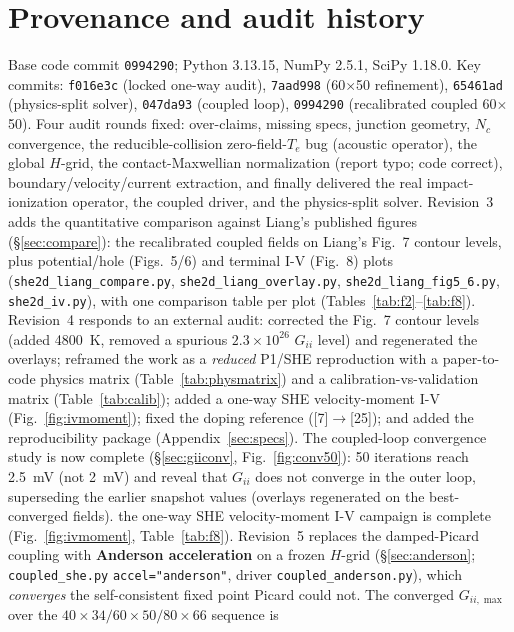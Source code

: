 \documentclass[11pt]{article}
\begin{document}
\section{Provenance and audit history}\label{sec:history}
Base code commit \texttt{0994290}; Python 3.13.15, NumPy 2.5.1, SciPy 1.18.0. Key commits:
\texttt{f016e3c} (locked one-way audit), \texttt{7aad998} (60$\times$50 refinement),
\texttt{65461ad} (physics-split solver), \texttt{047da93} (coupled loop), \texttt{0994290}
(recalibrated coupled 60$\times$50). Four audit rounds fixed:
over-claims, missing specs, junction geometry, $N_c$ convergence, the reducible-collision
zero-field-$T_e$ bug (acoustic operator), the global $H$-grid, the contact-Maxwellian
normalization (report typo; code correct), boundary/velocity/current extraction, and finally
delivered the real impact-ionization operator, the coupled driver, and the physics-split solver.
Revision~3 adds the quantitative comparison against Liang's published figures
(\S\ref{sec:compare}): the recalibrated coupled fields on Liang's Fig.~7 contour levels, plus
potential/hole (Figs.~5/6) and terminal I-V (Fig.~8) plots
(\texttt{she2d\_liang\_compare.py}, \texttt{she2d\_liang\_overlay.py},
\texttt{she2d\_liang\_fig5\_6.py}, \texttt{she2d\_iv.py}), with one comparison table per plot
(Tables~\ref{tab:f2}--\ref{tab:f8}).
Revision~4 responds to an external audit: corrected the Fig.~7 contour levels (added \SI{4800}{K},
removed a spurious $2.3\times10^{26}$ $G_{ii}$ level) and regenerated the overlays; reframed the
work as a \emph{reduced} P1/SHE reproduction with a paper-to-code physics matrix
(Table~\ref{tab:physmatrix}) and a calibration-vs-validation matrix (Table~\ref{tab:calib});
added a one-way SHE velocity-moment I-V (Fig.~\ref{fig:ivmoment}); fixed the doping reference
([7]$\to$[25]); and added the reproducibility package (Appendix~\ref{sec:specs}). The coupled-loop convergence study is
now complete (\S\ref{sec:giiconv}, Fig.~\ref{fig:conv50}): 50 iterations reach \SI{2.5}{mV} (not
\SI{2}{mV}) and reveal that $G_{ii}$ does not converge in the outer loop, superseding the earlier
snapshot values (overlays regenerated on the best-converged fields). the one-way SHE velocity-moment I-V
campaign is complete (Fig.~\ref{fig:ivmoment}, Table~\ref{tab:f8}).
Revision~5 replaces the damped-Picard coupling with \textbf{Anderson acceleration} on a frozen
$H$-grid (\S\ref{sec:anderson}; \texttt{coupled\_she.py} \texttt{accel="anderson"}, driver
\texttt{coupled\_anderson.py}), which \emph{converges} the self-consistent fixed point Picard could
not. The converged $G_{ii,\max}$ over the $40{\times}34/60{\times}50/80{\times}66$ sequence is
\end{document}
